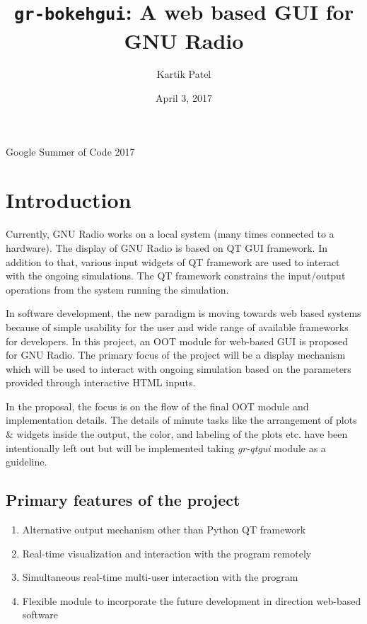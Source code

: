 \documentclass[a4paper, 11pt]{article}
\title{\texttt{gr-bokehgui}: A web based GUI for GNU Radio}
\author{Kartik Patel}
\date{April 3, 2017}
\begin{document}
\newcommand{\pull}[1]{\href{https://github.com/gnuradio/gnuradio/pull/#1}{\# #1}}

\begin{center}
\Large Google Summer of Code 2017
\end{center}

{\let\newpage\relax\maketitle}

\section{Introduction}
Currently, GNU Radio works on a local system (many times connected to a hardware). The display of GNU Radio is based on QT GUI framework. In addition to that, various input widgets of QT framework are used to interact with the ongoing simulations. The QT framework constrains the input/output operations from the system running the simulation.

In software development, the new paradigm is moving towards web based systems because of simple usability for the user and wide range of available frameworks for developers. In this project, an OOT module for web-based GUI is proposed for GNU Radio. The primary focus of the project will be a display mechanism which will be used to interact with ongoing simulation based on the parameters provided through interactive HTML inputs.

In the proposal, the focus is on the flow of the final OOT module and implementation details. The details of minute tasks like the arrangement of plots \& widgets inside the output, the color, and labeling of the plots etc. have been intentionally left out but will be implemented taking \textit{gr-qtgui} module as a guideline.


\subsection{Primary features of the project}
\begin{enumerate}
\item Alternative output mechanism other than Python QT framework
\item Real-time visualization and interaction with the program remotely
\item Simultaneous real-time multi-user interaction with the program
\item Flexible module to incorporate the future development in direction web-based software
\end{enumerate}
\end{document}
